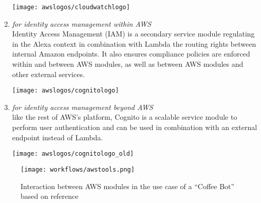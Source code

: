 \begin{enumerate}
	
	\begin{restoretext}
\begin{flushright}
	\texttt{[image: awslogos/cloudwatchlogo]}
\end{flushright}
	\end{restoretext}


	\item[\href{https://aws.amazon.com/iam/}{\textbf{IAM}} \footnote{\url{https://aws.amazon.com/iam}}]
	\textit{for identity access management within AWS}\\
	Identity Access Management (IAM) is a secondary service module regulating in the Alexa context in combination with Lambda the routing rights between internal Amazon endpoints. It also ensures compliance policies are enforced within and between AWS modules, as well as between AWS modules and other external services.
	
	
	\begin{restoretext}
\begin{flushright}
	\texttt{[image: awslogos/cognitologo]}
\end{flushright}
	\end{restoretext}


	\item[\href{https://aws.amazon.com/cognito/}{\textbf{Cognito}} \footnote{\url{https://aws.amazon.com/cognito}}]
	\textit{for identity access management beyond AWS}\\
	like the rest of AWS's platform, Cognito is a scalable service module to perform user authentication and can be used in combination with an external endpoint instead of Lambda.
	
		\begin{restoretext}
\begin{flushright}
	\texttt{[image: awslogos/cognitologo\_old]}
\end{flushright}
	\end{restoretext}
	
\end{enumerate}


\begin{figure}[h]
	\caption{Interaction between AWS modules in the use case of a ``Coffee Bot'' based on reference \cite{aws:lex_webinar} }\label{lex_interactionExample}
	\centering
	\texttt{[image: workflows/awstools.png]}
\end{figure}
%

